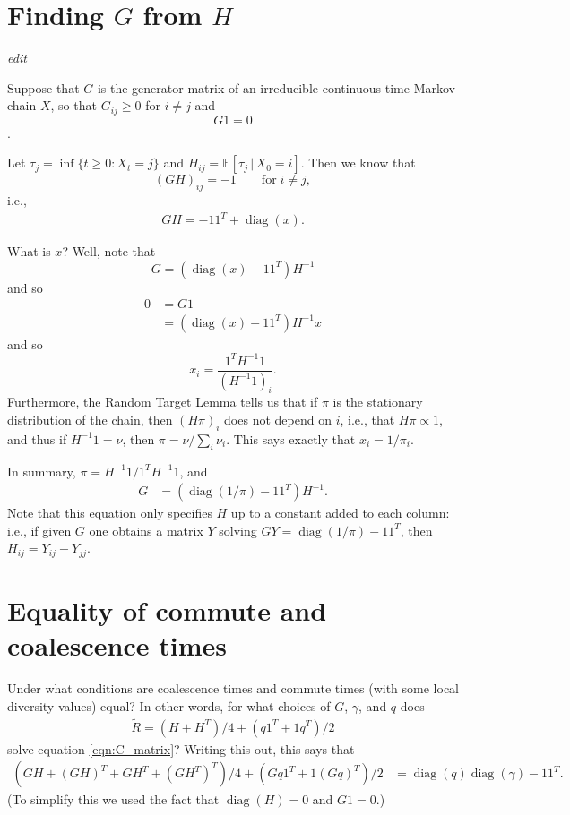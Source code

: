 \documentclass{article}
\newcommand{\comdist}{\widetilde{R}}
\DeclareMathOperator{\diag}{\mathop{\mbox{diag}}}
\newcommand{\E}{\mathbb{E}}
\newcommand{\plr}[1]{{\em \color{blue} #1}}
\begin{document}


\appendix
\renewcommand{\thefigure}{S\arabic{figure}}
\setcounter{figure}{0}


\section{Finding $G$ from $H$}
\label{apx::hitting_calcs}

\plr{edit}

Suppose that $G$ is the generator matrix of an irreducible continuous-time Markov chain $X$,
so that $G_{ij} \ge 0$ for $i \neq j$ and
$$ G 1 = 0 $$.

Let $\tau_{j} = \inf\{t \ge 0 : X_t = j\}$ and $H_{ij} = \E[\tau_j \,|\, X_0 = i]$.
Then we know that
$$
    (G H)_{ij} = -1 \qquad \text{for} \; i \neq j ,
$$
i.e.,
\begin{align} \label{eqn:GH}
    GH = - 1 1^T + \diag(x).
\end{align}

What is $x$?  Well, note that
$$
    G = (\diag(x) - 1 1^T) H^{-1}
$$
and so
$$ \begin{aligned}
    0 &= G1 \\
    &= (\diag(x) - 1 1^T) H^{-1} x 
\end{aligned} $$
and so
$$
    x_i = \frac{ 1^T H^{-1} 1 }{ (H^{-1} 1)_i } .
$$
Furthermore,
the Random Target Lemma \citep{aldous} %
tells us that if $\pi$ is the stationary distribution of the chain, then 
$(H \pi)_i$ does not depend on $i$,
i.e., that $H \pi \propto 1$,
and thus if $H^{-1} 1 = \nu$, 
then $\pi = \nu / \sum_i \nu_i$.
This says exactly that $x_i = 1/\pi_i$.

In summary, $\pi = H^{-1} 1 / 1^T H^{-1} 1$, and 
\begin{align}
    G 
    &= (\diag(1/\pi) - 1 1^T) H^{-1} .
\end{align}
Note that this equation only specifies $H$ up to a constant added to each column:
i.e., if given $G$ one obtains a matrix $Y$ solving $GY = \diag(1/\pi) - 1 1^T$,
then $H_{ij} = Y_{ij} - Y_{jj}$.


\section{Equality of commute and coalescence times}
\label{sec:com_eq_coal}

Under what conditions are coalescence times and commute times (with some local diversity values) equal?
In other words, for what choices of $G$, $\gamma$, and $q$ does
\begin{align}
    \comdist = (H + H^T)/4 + (q 1^T + 1 q^T)/2
\end{align}
solve equation \eqref{eqn:C_matrix}?
Writing this out, this says that
\begin{align} \label{eqn:R_coal}
    ( GH + (GH)^T + GH^T + (GH^T)^T )/4 + (Gq 1^T + 1 (Gq)^T)/2
    &=
    \diag(q) \diag(\gamma) - 1 1^T .
\end{align}
(To simplify this we used the fact that $\diag(H) = 0$ and $G1 = 0$.)
\end{document}
